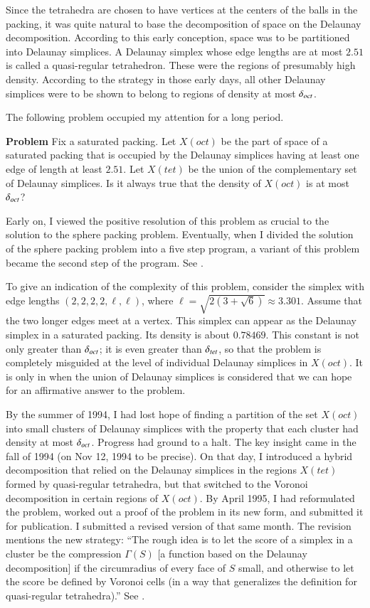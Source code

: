 Since the tetrahedra are chosen to have vertices at the centers of
the balls in the packing, it was quite natural to base the
decomposition of space on the Delaunay decomposition. According to
this early conception, space was to be partitioned into Delaunay
simplices.  A Delaunay simplex whose edge lengths are at most
$2.51$ is called a quasi-regular tetrahedron.  These were the
regions of presumably high density.  According to the strategy in
those early days, all other Delaunay simplices were to be shown to
belong to regions of density at most $\delta_{oct}$.

The following problem occupied my attention for a long period.


\smallskip\noindent
{\bf Problem} Fix a saturated packing. Let $X(oct)$ be the part of
space of a saturated packing that is occupied by the Delaunay
simplices having at least one edge of length at least $2.51$.  Let
$X(tet)$ be the union of the complementary set of Delaunay
simplices.  Is it always true that the density of $X(oct)$ is at
most $\delta_{oct}$?

Early on, I viewed the positive resolution of this problem as
crucial to the solution to the sphere packing problem.  Eventually,
when I divided the solution of the sphere packing problem into a five step
program, a variant of this problem became the second step of the
program. See \cite{part2}.

To give an indication of the complexity of this problem, consider
the simplex with edge lengths $(2,2,2,2,\ell,\ell)$, where $\ell =
\sqrt{2 (3 + \sqrt6)}\approx 3.301$.  Assume that the two longer
edges meet at a vertex.  This simplex can appear as the Delaunay
simplex in a saturated packing.  Its density is about $0.78469$.
This constant is not only greater than $\delta_{oct}$; it is even greater
than $\delta_{tet}$, so that the problem is completely misguided at the
level of individual Delaunay simplices in $X(oct)$.  It is only in
when the union of Delaunay simplices is considered that we can
hope for an affirmative answer to the problem.

By the summer of 1994, I had lost hope of finding a partition of
the set $X(oct)$ into small clusters of Delaunay simplices with
the property that each cluster had density at most $\delta_{oct}$.
Progress had ground to a halt.   The key insight came in the fall
of 1994 (on Nov 12, 1994 to be precise). On that day, I introduced
a hybrid decomposition that relied on the Delaunay simplices in
the regions $X(tet)$ formed by quasi-regular tetrahedra, but that
switched to the Voronoi decomposition in certain regions of
$X(oct)$. By April 1995, I had reformulated the problem, worked
out a proof of the problem \cite{part2} in its new form, and
submitted it for publication. I submitted a revised version of
\cite{part1} that same month.  The revision mentions the new
strategy: ``The rough idea is to let the score of a simplex in a
cluster be the compression $\Gamma(S)$ [a function based on the
Delaunay decomposition] if the circumradius of every face of $S$
small, and otherwise to let the score be defined by Voronoi cells
(in a way that generalizes the definition for quasi-regular
tetrahedra).'' See \cite[p.6]{part1}.


